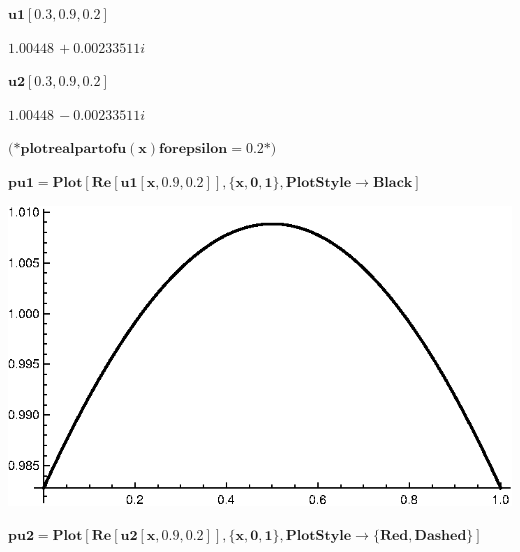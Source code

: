 {\begin{doublespace}
\noindent\(\pmb{\text{u1}[0.3,0.9,0.2]}\)
\end{doublespace}

\begin{doublespace}
\noindent\(1.00448\, +0.00233511 i\)
\end{doublespace}

\begin{doublespace}
\noindent\(\pmb{\text{u2}[0.3,0.9,0.2]}\)
\end{doublespace}

\begin{doublespace}
\noindent\(1.00448\, -0.00233511 i\)
\end{doublespace}

\begin{doublespace}
\noindent\(\pmb{\text{(*} \text{plot} \text{real} \text{part} \text{of} u(x) \text{for} \text{epsilon} = 0.2 \text{*)}}\)
\end{doublespace}

\begin{doublespace}
\noindent\(\pmb{\text{pu1}=\text{Plot}[\text{Re}[\text{u1}[x,0.9,0.2]],\{x,0,1\},\text{PlotStyle}\to \text{Black}]}\)
\end{doublespace}

\includegraphics{chapters/appendices/KP_Mathematica/Kronig_Penney_model_transfer_matrix_gr8.eps}

\begin{doublespace}
\noindent\(\pmb{\text{pu2}=\text{Plot}[\text{Re}[\text{u2}[x,0.9,0.2]],\{x,0,1\},\text{PlotStyle}\to \{\text{Red},\text{Dashed}\}]}\)
\end{doublespace}

}
